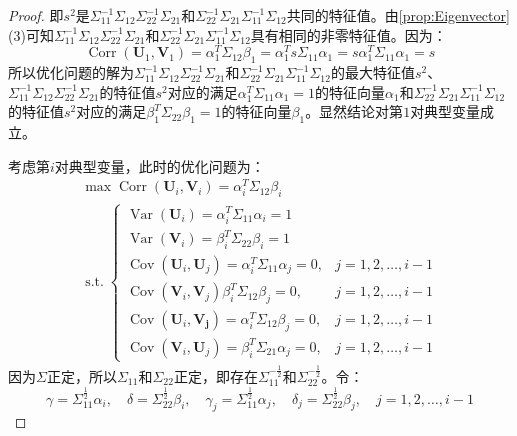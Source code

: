 \begin{proof}
	即$s^2$是$\Sigma_{11}^{-1}\Sigma_{12}\Sigma_{22}^{-1}\Sigma_{21}$和$\Sigma_{22}^{-1}\Sigma_{21}\Sigma_{11}^{-1}\Sigma_{12}$共同的特征值。由\cref{prop:Eigenvector}(3)可知$\Sigma_{11}^{-1}\Sigma_{12}\Sigma_{22}^{-1}\Sigma_{21}$和$\Sigma_{22}^{-1}\Sigma_{21}\Sigma_{11}^{-1}\Sigma_{12}$具有相同的非零特征值。因为：
	\begin{equation*}
		\operatorname{Corr}(\mathbf{U}_1,\mathbf{V}_1)=\alpha_1^T\Sigma_{12}\beta_1=\alpha_1^Ts\Sigma_{11}\alpha_1=s\alpha_1^T\Sigma_{11}\alpha_1=s
	\end{equation*}
	所以优化问题的解为$\Sigma_{11}^{-1}\Sigma_{12}\Sigma_{22}^{-1}\Sigma_{21}$和$\Sigma_{22}^{-1}\Sigma_{21}\Sigma_{11}^{-1}\Sigma_{12}$的最大特征值$s^2$、$\Sigma_{11}^{-1}\Sigma_{12}\Sigma_{22}^{-1}\Sigma_{21}$的特征值$s^2$对应的满足$\alpha_1^T\Sigma_{11}\alpha_1=1$的特征向量$\alpha_1$和$\Sigma_{22}^{-1}\Sigma_{21}\Sigma_{11}^{-1}\Sigma_{12}$的特征值$s^2$对应的满足$\beta_1^T\Sigma_{22}\beta_1=1$的特征向量$\beta_1$。显然结论对第$1$对典型变量成立。\par
	考虑第$i$对典型变量，此时的优化问题为：
	\begin{gather*}
		\max\operatorname{Corr}(\mathbf{U}_i,\mathbf{V}_i)=\alpha_i^T\Sigma_{12}\beta_i \\
		\operatorname{s.t.}
		\begin{cases}
			\operatorname{Var}(\mathbf{U}_i)=\alpha_i^T\Sigma_{11}\alpha_i=1 \\
			\operatorname{Var}(\mathbf{V}_i)=\beta_i^T\Sigma_{22}\beta_i=1 \\
			\operatorname{Cov}(\mathbf{U}_i,\mathbf{U}_j)=\alpha_i^T\Sigma_{11}\alpha_j=0,&j=1,2,\dots,i-1 \\
			\operatorname{Cov}(\mathbf{V}_i,\mathbf{V}_j)\beta_i^T\Sigma_{12}\beta_j=0,&j=1,2,\dots,i-1 \\
			\operatorname{Cov}(\mathbf{U}_i,\mathbf{V_j})=\alpha_i^T\Sigma_{12}\beta_j=0,&j=1,2,\dots,i-1 \\
			\operatorname{Cov}(\mathbf{V}_i,\mathbf{U}_j)=\beta_i^T\Sigma_{21}\alpha_j=0,&j=1,2,\dots,i-1
		\end{cases}
	\end{gather*}
	因为$\Sigma$正定，所以$\Sigma_{11}$和$\Sigma_{22}$正定，即存在$\Sigma_{11}^{-\frac{1}{2}}$和$\Sigma_{22}^{-\frac{1}{2}}$。令：
	\begin{equation*}
		\gamma=\Sigma_{11}^{\frac{1}{2}}\alpha_i,\quad\delta=\Sigma_{22}^{\frac{1}{2}}\beta_i,\quad\gamma_j=\Sigma_{11}^{\frac{1}{2}}\alpha_j,\quad\delta_j=\Sigma_{22}^{\frac{1}{2}}\beta_j,\quad j=1,2,\dots,i-1

\end{equation*}
\end{proof}
